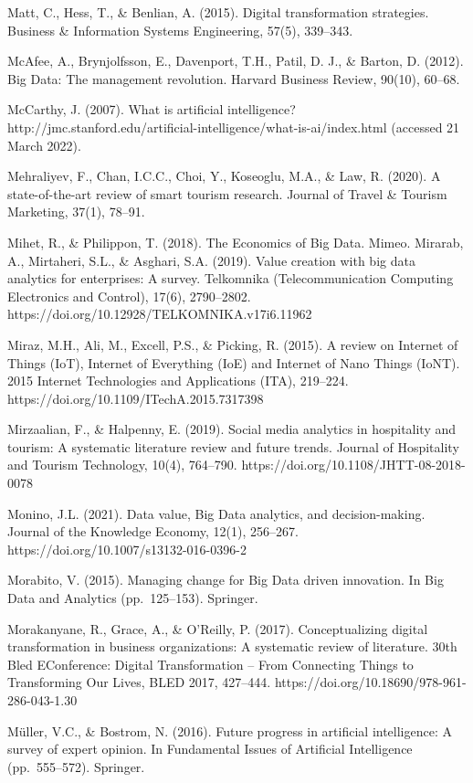 \documentclass[
  letterpaper,
  DIV=11,
  numbers=noendperiod]{scrreprt}
\begin{document}
Matt, C., Hess, T., \& Benlian, A. (2015). Digital transformation
strategies. Business \& Information Systems Engineering, 57(5),
339--343.

McAfee, A., Brynjolfsson, E., Davenport, T.H., Patil, D. J., \& Barton,
D. (2012). Big Data: The management revolution. Harvard Business Review,
90(10), 60--68.

McCarthy, J. (2007). What is artificial intelligence?
http://jmc.stanford.edu/artificial-intelligence/what-is-ai/index.html
(accessed 21 March 2022).

Mehraliyev, F., Chan, I.C.C., Choi, Y., Koseoglu, M.A., \& Law, R.
(2020). A state-of-the-art review of smart tourism research. Journal of
Travel \& Tourism Marketing, 37(1), 78--91.

Mihet, R., \& Philippon, T. (2018). The Economics of Big Data. Mimeo.
Mirarab, A., Mirtaheri, S.L., \& Asghari, S.A. (2019). Value creation
with big data analytics for enterprises: A survey. Telkomnika
(Telecommunication Computing Electronics and Control), 17(6),
2790--2802. https://doi.org/10.12928/TELKOMNIKA.v17i6.11962

Miraz, M.H., Ali, M., Excell, P.S., \& Picking, R. (2015). A review on
Internet of Things (IoT), Internet of Everything (IoE) and Internet of
Nano Things (IoNT). 2015 Internet Technologies and Applications (ITA),
219--224. https://doi.org/10.1109/ITechA.2015.7317398

Mirzaalian, F., \& Halpenny, E. (2019). Social media analytics in
hospitality and tourism: A systematic literature review and future
trends. Journal of Hospitality and Tourism Technology, 10(4), 764--790.
https://doi.org/10.1108/JHTT-08-2018-0078

Monino, J.L. (2021). Data value, Big Data analytics, and
decision-making. Journal of the Knowledge Economy, 12(1), 256--267.
https://doi.org/10.1007/s13132-016-0396-2

Morabito, V. (2015). Managing change for Big Data driven innovation. In
Big Data and Analytics (pp.~125--153). Springer.

Morakanyane, R., Grace, A., \& O'Reilly, P. (2017). Conceptualizing
digital transformation in business organizations: A systematic review of
literature. 30th Bled EConference: Digital Transformation -- From
Connecting Things to Transforming Our Lives, BLED 2017, 427--444.
https://doi.org/10.18690/978-961-286-043-1.30

Müller, V.C., \& Bostrom, N. (2016). Future progress in artificial
intelligence: A survey of expert opinion. In Fundamental Issues of
Artificial Intelligence (pp.~555--572). Springer.
\end{document}
